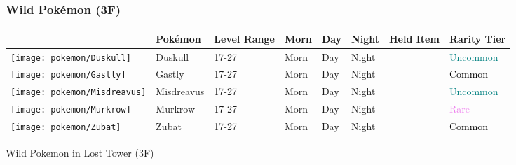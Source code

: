 \subsubsection{Wild Pokémon (3F)}%
\label{ssubsec:WildPokmon(3F)}%
\begin{longtable}{||l l l l l l l l||}%
\hline%
&Pokémon&Level Range&Morn&Day&Night&Held Item&Rarity Tier\\%
\hline%
\endhead%
\hline%
\texttt{[image: pokemon/Duskull]}&Duskull&17{-}27&Morn&Day&Night&&\textcolor{teal}{%
Uncommon%
}\\%
\hline%
\texttt{[image: pokemon/Gastly]}&Gastly&17{-}27&Morn&Day&Night&&\textcolor{black}{%
Common%
}\\%
\hline%
\texttt{[image: pokemon/Misdreavus]}&Misdreavus&17{-}27&Morn&Day&Night&&\textcolor{teal}{%
Uncommon%
}\\%
\hline%
\texttt{[image: pokemon/Murkrow]}&Murkrow&17{-}27&Morn&Day&Night&&\textcolor{violet}{%
Rare%
}\\%
\hline%
\texttt{[image: pokemon/Zubat]}&Zubat&17{-}27&Morn&Day&Night&&\textcolor{black}{%
Common%
}\\%
\hline%
\end{longtable}%
\caption{Wild Pokemon in Lost Tower (3F)}